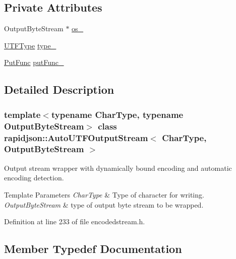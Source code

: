 \subsection*{Private Attributes}
\begin{DoxyCompactItemize}
\item 
Output\+Byte\+Stream $\ast$ \mbox{\hyperlink{classrapidjson_1_1_auto_u_t_f_output_stream_a6db71fad149c823ee1eed1b04440cb1f}{os\+\_\+}}
\item 
\mbox{\hyperlink{namespacerapidjson_a4aacabc0f8cea1cd628f466d890773eb}{U\+T\+F\+Type}} \mbox{\hyperlink{classrapidjson_1_1_auto_u_t_f_output_stream_afd7503e0eb83f1d5f90292d2d2779ead}{type\+\_\+}}
\item 
\mbox{\hyperlink{classrapidjson_1_1_auto_u_t_f_output_stream_a2572eb3b4d77c0a2466ba21635ff79b5}{Put\+Func}} \mbox{\hyperlink{classrapidjson_1_1_auto_u_t_f_output_stream_a8a5b6ba6993b01a9a08124fe2a8fceb1}{put\+Func\+\_\+}}
\end{DoxyCompactItemize}


\subsection{Detailed Description}
\subsubsection*{template$<$typename Char\+Type, typename Output\+Byte\+Stream$>$\newline
class rapidjson\+::\+Auto\+U\+T\+F\+Output\+Stream$<$ Char\+Type, Output\+Byte\+Stream $>$}

Output stream wrapper with dynamically bound encoding and automatic encoding detection. 


\begin{DoxyTemplParams}{Template Parameters}
{\em Char\+Type} & Type of character for writing. \\
\hline
{\em Output\+Byte\+Stream} & type of output byte stream to be wrapped. \\
\hline
\end{DoxyTemplParams}


Definition at line 233 of file encodedstream.\+h.



\subsection{Member Typedef Documentation}
\mbox{\label{classrapidjson_1_1_auto_u_t_f_output_stream_aaf40884d8f4fbf24ea040d3363c9967e}} 
